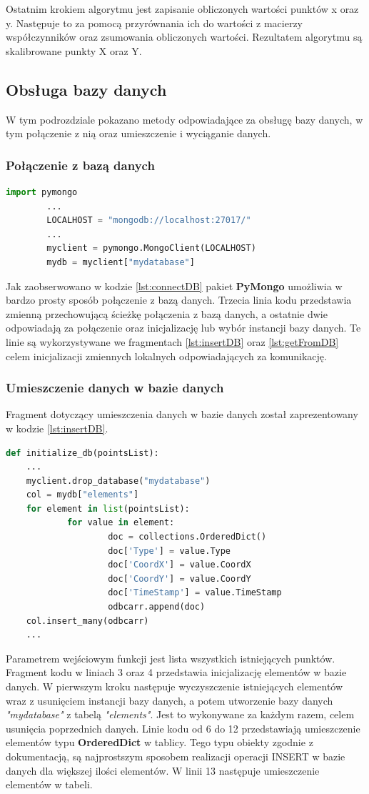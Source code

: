 Ostatnim krokiem algorytmu jest zapisanie obliczonych wartości punktów x oraz y. Następuje to za pomocą przyrównania ich do wartości z macierzy współczynników oraz zsumowania obliczonych wartości. Rezultatem algorytmu są skalibrowane punkty X oraz Y.
\subsection{Obsługa bazy danych}
W tym podrozdziale pokazano metody odpowiadające za obsługę bazy danych, w tym połączenie z nią oraz umieszczenie i wyciąganie danych.
\label{ssec:db}
\subsubsection{Połączenie z bazą danych}
\begin{lstlisting}[language=Python, caption=Połączenie z bazą danych, label={lst:connectDB}]
        import pymongo
        ...
        LOCALHOST = "mongodb://localhost:27017/"
        ...
        myclient = pymongo.MongoClient(LOCALHOST)
        mydb = myclient["mydatabase"]
\end{lstlisting}
Jak zaobserwowano w kodzie \ref{lst:connectDB} pakiet \textbf{PyMongo} umożliwia w bardzo prosty sposób połączenie z bazą danych. Trzecia linia kodu przedstawia zmienną przechowującą ścieżkę połączenia z bazą danych, a ostatnie dwie odpowiadają za połączenie oraz inicjalizację lub wybór instancji bazy danych. Te linie są wykorzystywane we fragmentach \ref{lst:insertDB} oraz \ref{lst:getFromDB} celem inicjalizacji zmiennych lokalnych odpowiadających za komunikację.
\subsubsection{Umieszczenie danych w bazie danych}
\label{ssec:insertDB}
Fragment dotyczący umieszczenia danych w bazie danych został zaprezentowany w kodzie \ref{lst:insertDB}. 
\begin{lstlisting}[language=Python, caption=Umieszczenie danych w bazie danych, label={lst:insertDB}]
def initialize_db(pointsList):
    ...
    myclient.drop_database("mydatabase")
    col = mydb["elements"]
    for element in list(pointsList):
            for value in element:
                    doc = collections.OrderedDict()
                    doc['Type'] = value.Type
                    doc['CoordX'] = value.CoordX
                    doc['CoordY'] = value.CoordY
                    doc['TimeStamp'] = value.TimeStamp
                    odbcarr.append(doc)
    col.insert_many(odbcarr)
    ...
\end{lstlisting}
Parametrem wejściowym funkcji jest lista wszystkich istniejących punktów. Fragment kodu w liniach 3 oraz 4 przedstawia inicjalizację elementów w bazie danych. W pierwszym kroku następuje wyczyszczenie istniejących elementów wraz z usunięciem instancji bazy danych, a potem utworzenie bazy danych \emph{"mydatabase"} z tabelą \emph{"elements"}. Jest to wykonywane za każdym razem, celem usunięcia poprzednich danych. Linie kodu od 6 do 12 przedstawiają umieszczenie elementów typu \textbf{OrderedDict} w tablicy. Tego typu obiekty zgodnie z dokumentacją, są najprostszym sposobem realizacji operacji INSERT w bazie danych dla większej ilości elementów. W linii 13 następuje umieszczenie elementów w tabeli.

